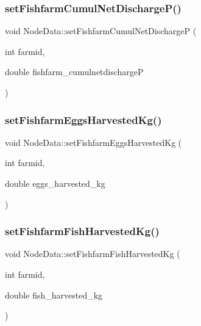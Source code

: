\subsubsection{\texorpdfstring{setFishfarmCumulNetDischargeP()}{setFishfarmCumulNetDischargeP()}}
{\footnotesize\ttfamily void Node\+Data\+::set\+Fishfarm\+Cumul\+Net\+DischargeP (\begin{DoxyParamCaption}\item[{int}]{farmid,  }\item[{double}]{fishfarm\+\_\+cumulnetdischargeP }\end{DoxyParamCaption})}

\mbox{\label{class_node_data_a948b2c7ae9c22e0aa5fb0e5d88d4fac2}} 
\subsubsection{\texorpdfstring{setFishfarmEggsHarvestedKg()}{setFishfarmEggsHarvestedKg()}}
{\footnotesize\ttfamily void Node\+Data\+::set\+Fishfarm\+Eggs\+Harvested\+Kg (\begin{DoxyParamCaption}\item[{int}]{farmid,  }\item[{double}]{eggs\+\_\+harvested\+\_\+kg }\end{DoxyParamCaption})}

\mbox{\label{class_node_data_a761da675ad9067e9c13f75c1f0f2d268}} 
\subsubsection{\texorpdfstring{setFishfarmFishHarvestedKg()}{setFishfarmFishHarvestedKg()}}
{\footnotesize\ttfamily void Node\+Data\+::set\+Fishfarm\+Fish\+Harvested\+Kg (\begin{DoxyParamCaption}\item[{int}]{farmid,  }\item[{double}]{fish\+\_\+harvested\+\_\+kg }\end{DoxyParamCaption})}

\mbox{\label{class_node_data_ac37ac9705ee216314bef2042008dc3a4}} 
